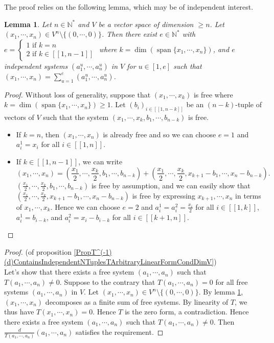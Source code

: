 \documentclass[a4paper,12pt]{article}
\DeclareMathOperator{\Span}{span}
\theoremstyle{plain}
\newtheorem{lemma}{Lemma}[section]
\theoremstyle{definition}
\theoremstyle{remark}
\begin{document}
The proof relies on the following lemma, which may be of independent interest.

\begin{lemma}
\label{LemmaAnyNTupleIsLinearCombinationOfFreeeSystems}
Let $n \in \mathbb{N}^*$ and $V$ be a vector space of dimension $\geq n$. Let $(x_1,\cdots,x_n) \in V^n \setminus \{(0,\cdots,0)\}$. Then there exist $e \in \mathbb{N}^*$ with $e = \begin{cases} 1 \text{ if } k=n \\ 2 \text{ if } k \in [\![1,n-1]\!] \end{cases}$ where $k = \dim(\Span\{x_1, \cdots, x_n\})$, and $e$ independent systems $(a^u_1,\cdots,a^u_n)$ in $V$ for $u \in [1,e]$ such that $(x_1,\cdots,x_n) = \sum_{u=1}^e (a^u_1,\cdots,a^u_n)$.
\end{lemma}

\begin{proof}
Without loss of generality, suppose that $(x_1, \cdots, x_k)$ is free where $k = \dim(\Span\{x_1, \cdots, x_n\}) \geq 1$. Let $(b_i)_{i \in [\![1,n-k]\!]}$ be an $(n-k)$-tuple of vectors of $V$ such that the system $(x_1,\cdots,x_k,b_1,\cdots,b_{n-k})$ is free.
\begin{itemize}
\item If $k=n$, then $(x_1, \cdots, x_n)$ is already free and so we can choose $e=1$ and $a^1_i = x_i$ for all $i \in [\![1,n]\!]$.
\item If $k \in [\![1,n-1]\!]$, we can write 
\[ (x_1, \cdots, x_n) = (\frac{x_1}{2},\cdots,\frac{x_k}{2},b_1,\cdots,b_{n-k}) + (\frac{x_1}{2},\cdots,\frac{x_k}{2},x_{k+1}-b_1,\cdots,x_n - b_{n-k}). \]
 $(\frac{x_1}{2},\cdots,\frac{x_k}{2},b_1,\cdots,b_{n-k})$ is free by assumption, and we can easily show that $(\frac{x_1}{2},\cdots,\frac{x_k}{2},x_{k+1}-b_1,\cdots,x_n - b_{n-k})$ is free by expressing $x_{k+1},\cdots,x_n$ in terms of $x_1,\cdots,x_k$. Hence we can choose $e=2$ and $a^1_i = a^2_i = \frac{x_i}{2}$ for all $i \in [\![1,k]\!]$, $a^1_i = b_{i-k}$, and $a^2_i = x_i - b_{i-k}$ for all $i \in [\![k+1,n]\!]$. 
\end{itemize}
\end{proof}

\begin{proof} (of proposition \ref{PropT^(-1)(d)ContainsIndependentNTuplesTArbitraryLinearFormCondDimV}) \\
Let's show that there exists a free system $(a_1,\cdots,a_n)$ such that $T(a_1,\cdots,a_n) \neq 0$. Suppose to the contrary that $T(a_1,\cdots,a_n) = 0$ for all free systems $(a_1,\cdots,a_n)$ in $V$. Let $(x_1,\cdots,x_n) \in V^n \setminus \{(0,\cdots,0)\}$. By lemma \ref{LemmaAnyNTupleIsLinearCombinationOfFreeeSystems}, $(x_1,\cdots,x_n)$ decomposes as a finite sum of free systems. By linearity of $T$, we thus have $T(x_1,\cdots,x_n)=0$. Hence $T$ is the zero form, a contradiction. Hence there exists a free system $(a_1,\cdots, a_n)$ such that $T(a_1,\cdots,a_n) \neq 0$. Then $\frac{d}{T(a_1,\cdots,a_n)}(a_1,\cdots,a_n)$ satisfies the requirement.
\end{proof}
\end{document}
